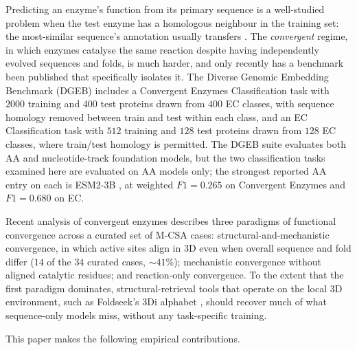 \documentclass[11pt,letterpaper]{article}
\begin{document}
Predicting an enzyme's function from its primary sequence is a
well-studied problem when the test enzyme has a homologous neighbour
in the training set: the most-similar sequence's annotation usually
transfers \citep{gligorijevic2021deepfri,yu2023clean}. The
\emph{convergent} regime, in which enzymes catalyse the same reaction
despite having independently evolved sequences and folds, is much
harder, and only recently has a benchmark been published that
specifically isolates it. The Diverse Genomic Embedding Benchmark
(DGEB) \citep{westroberts2024dgeb} includes a Convergent Enzymes
Classification task with $2000$ training and $400$ test proteins drawn
from $400$ EC classes, with sequence homology removed between train
and test within each class, and an EC Classification task with $512$
training and $128$ test proteins drawn from $128$ EC classes, where
train/test homology is permitted. The DGEB suite evaluates both AA
and nucleotide-track foundation models, but the two classification
tasks examined here are evaluated on AA models only; the strongest
reported AA entry on each is ESM2-3B \citep{lin2023esm2}, at weighted
$F1 = 0.265$ on Convergent Enzymes and $F1 = 0.680$ on EC.

Recent analysis of convergent enzymes \citep{riziotis2025paradigms}
describes three paradigms of functional convergence across a curated
set of M-CSA cases: structural-and-mechanistic convergence, in which
active sites align in 3D even when overall sequence and fold differ
($14$ of the $34$ curated cases, ${\sim}41\%$); mechanistic
convergence without aligned catalytic residues; and reaction-only
convergence. To the
extent that the first paradigm dominates, structural-retrieval tools
that operate on the local 3D environment, such as Foldseek's 3Di
alphabet \citep{vankempen2024foldseek}, should recover much of what
sequence-only models miss, without any task-specific training.

This paper makes the following empirical contributions.
\end{document}
